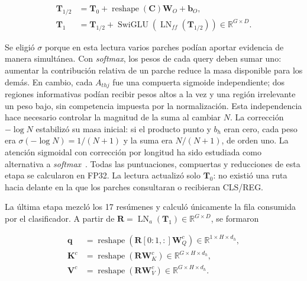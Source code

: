 \begin{equation}
    \begin{aligned}
    \mathbf T_{1/2}&=\mathbf T_0+
       \operatorname{reshape}(\mathbf C)\mathbf W_O+\mathbf b_O,\\
    \mathbf T_1&=\mathbf T_{1/2}+
       \operatorname{SwiGLU}(\operatorname{LN}_{ff}(\mathbf T_{1/2}))
       \in\mathbb R^{G\times D}.
    \end{aligned}
    \label{eq:residual-global-mil}
\end{equation}

Se eligió \(\sigma\) porque en esta lectura varios parches podían aportar
evidencia de manera simultánea. Con \emph{softmax}, los pesos de cada query
deben sumar uno: aumentar la contribución relativa de un parche reduce la masa
disponible para los demás. En cambio, cada \(A_{thj}\) fue una compuerta
sigmoide independiente; dos regiones informativas podían recibir pesos altos a
la vez y una región irrelevante un peso bajo, sin competencia impuesta por la
normalización. Esta independencia hace necesario controlar la magnitud de la
suma al cambiar \(N\). La corrección \(-\log N\) estabilizó su masa inicial:
si el producto punto y \(b_h\) eran cero, cada peso era
\(\sigma(-\log N)=1/(N+1)\) y la suma era \(N/(N+1)\), de orden uno. La
atención sigmoidal con corrección por longitud ha sido estudiada como
alternativa a \emph{softmax}~\cite{ramapuram_sigmoid_2025}. Todas las
puntuaciones, compuertas y reducciones de esta etapa se calcularon en FP32.
La lectura actualizó solo \(\mathbf T_0\): no existió una ruta hacia delante en
la que los parches consultaran o recibieran CLS/REG.

La última etapa mezcló los 17 resúmenes y calculó únicamente la fila consumida
por el clasificador. A partir de
\(\mathbf R=\operatorname{LN}_{a}(\mathbf T_1)\in\mathbb R^{G\times D}\), se
formaron

\begin{equation}
    \begin{aligned}
    \mathbf q&=\operatorname{reshape}(\mathbf R[0{:}1,:]\mathbf W_Q^{c})
       \in\mathbb R^{1\times H\times d_h},\\
    \mathbf K^{c}&=\operatorname{reshape}(\mathbf R\mathbf W_K^{c})
       \in\mathbb R^{G\times H\times d_h},\\
    \mathbf V^{c}&=\operatorname{reshape}(\mathbf R\mathbf W_V^{c})
       \in\mathbb R^{G\times H\times d_h}.
    \end{aligned}
    \label{eq:qkv-cls-final-mil}
\end{equation}

